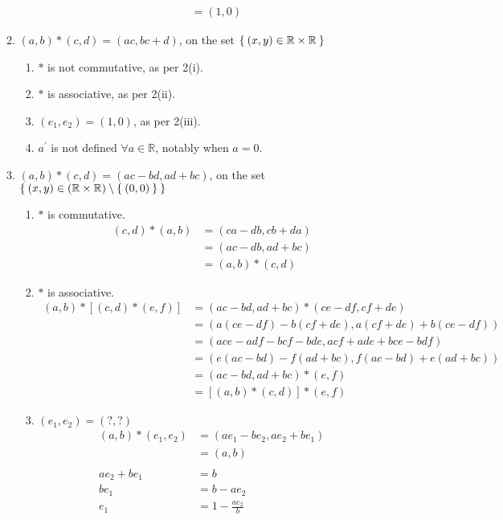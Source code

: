 \begin{enumerate}[label={\Alph*.},font={\bfseries}]
\begin{enumerate}[label={\arabic*},font={\bfseries}]
\begin{enumerate}[label={(\roman*)}]
\begin{align*}
        &= (1,0)
      \end{align*}
    \end{enumerate}
  \item $(a, b) * (c, d) = (ac, bc + d)$, on the set $\Set{(x,y)\in\mathbb{R}\times\mathbb{R}}$
    \begin{enumerate}[label={(\roman*)}]
    \item $*$ is not commutative, as per 2(i).
    \item $*$ is associative, as per 2(ii).
    \item $(e_1,e_2) = (1,0)$, as per 2(iii).
    \item $a^\prime$ is not defined $\forall a\in\mathbb{R}$, notably when $a=0$.
    \end{enumerate}
  \item $(a, b) * (c, d) = (ac-bd,ad+bc)$, on the set $\Set{(x,y)\in(\mathbb{R}\times\mathbb{R})\setminus\Set{(0,0)}}$
    \begin{enumerate}[label={(\roman*)}]
    \item $*$ is commutative.
      \begin{align*}
        (c,d) * (a,b) &= (ca-db,cb+da) \\
        &= (ac-db,ad+bc) \\
        &= (a,b) * (c,d)
      \end{align*}
    \item $*$ is associative.
      \begin{align*}
        (a,b) * \left[(c,d) * (e,f)\right] &= (ac-bd,ad+bc) * (ce-df,cf+de) \\
        &= \left(a(ce-df) - b(cf+de), a(cf+de)+b(ce-df)\right) \\
        &= (ace-adf-bcf-bde, acf+ade+bce-bdf) \\
        &= \left(e(ac-bd)-f(ad+bc), f(ac-bd)+e(ad+bc)\right) \\
        &= (ac-bd,ad+bc) * (e,f) \\
        &= \left[(a,b) * (c,d)\right] * (e,f)
      \end{align*}
    \item $(e_1,e_2) = (?,?)$
      \begin{align*}
        (a,b) * (e_1,e_2) &= (ae_1-be_2,ae_2+be_1) \\
        &= (a,b) \\
        \\
        ae_2+be_1 &= b \\
        be_1 &= b - ae_2 \\
        e_1 &= 1 - \frac{ae_2}{b} \\

\end{align*}
\end{enumerate}
\end{enumerate}
\end{enumerate}
